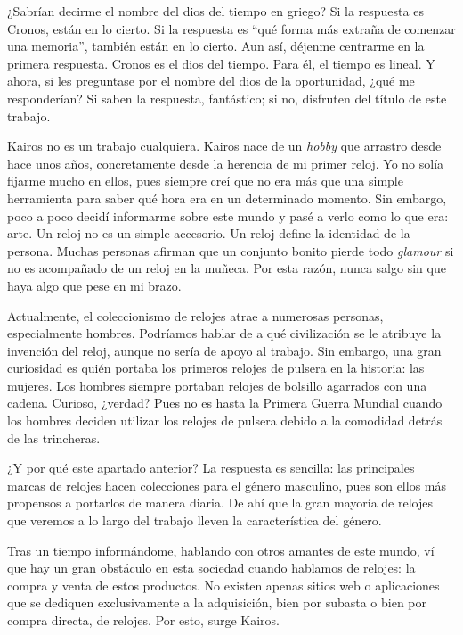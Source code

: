 
¿Sabrían decirme el nombre del dios del tiempo en griego? Si la respuesta es Cronos, están en lo cierto. Si la respuesta es ``qué forma más extraña de comenzar una memoria'', también están en lo cierto. Aun así, déjenme centrarme en la primera respuesta. Cronos es el dios del tiempo. Para él, el tiempo es lineal. Y ahora, si les preguntase por el nombre del dios de la oportunidad, ¿qué me responderían? Si saben la respuesta, fantástico; si no, disfruten del título de este trabajo.

Kairos no es un trabajo cualquiera. Kairos nace de un \emph{hobby} que arrastro desde hace unos años, concretamente desde la herencia de mi primer reloj. Yo no solía fijarme mucho en ellos, pues siempre creí que no era más que una simple herramienta para saber qué hora era en un determinado momento. Sin embargo, poco a poco decidí informarme sobre este mundo y pasé a verlo como lo que era: arte. Un reloj no es un simple accesorio. Un reloj define la identidad de la persona. Muchas personas afirman que un conjunto bonito pierde todo \emph{glamour} si no es acompañado de un reloj en la muñeca. Por esta razón, nunca salgo sin que haya algo que pese en mi brazo.

Actualmente, el coleccionismo de relojes atrae a numerosas personas, especialmente hombres. Podríamos hablar de a qué civilización se le atribuye la invención del reloj, aunque no sería de apoyo al trabajo. Sin embargo, una gran curiosidad es quién portaba los primeros relojes de pulsera en la historia: las mujeres. Los hombres siempre portaban relojes de bolsillo agarrados con una cadena. Curioso, ¿verdad? Pues no es hasta la Primera Guerra Mundial cuando los hombres deciden utilizar los relojes de pulsera debido a la comodidad detrás de las trincheras.

¿Y por qué este apartado anterior? La respuesta es sencilla: las principales marcas de relojes hacen colecciones para el género masculino, pues son ellos más propensos a portarlos de manera diaria. De ahí que la gran mayoría de relojes que veremos a lo largo del trabajo lleven la característica del género.

Tras un tiempo informándome, hablando con otros amantes de este mundo, ví que hay un gran obstáculo en esta sociedad cuando hablamos de relojes: la compra y venta de estos productos. No existen apenas sitios web o aplicaciones que se dediquen exclusivamente a la adquisición, bien por subasta o bien por compra directa, de relojes. Por esto, surge Kairos.

